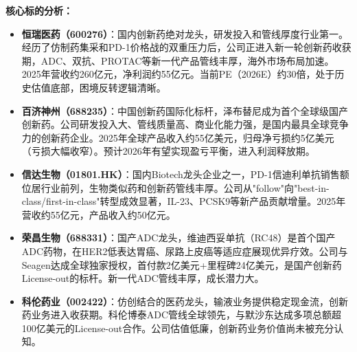 \begin{exhibitbox}[图 6-6：创新药产业链图谱与核心标的]
\vspace{0.2cm}
\end{exhibitbox}

\textbf{核心标的分析：}

\begin{itemize}[leftmargin=2em]
\item \textbf{恒瑞医药（600276）}：国内创新药绝对龙头，研发投入和管线厚度行业第一。经历了仿制药集采和PD-1价格战的双重压力后，公司正进入新一轮创新药收获期，ADC、双抗、PROTAC等新一代产品管线丰厚，海外市场布局加速。2025年营收约260亿元，净利润约55亿元。当前PE（2026E）约30倍，处于历史估值底部，困境反转逻辑清晰。

\item \textbf{百济神州（688235）}：中国创新药国际化标杆，泽布替尼成为首个全球级国产创新药。公司研发投入大、管线质量高、商业化能力强，是国内最具全球竞争力的创新药企业。2025年全球产品收入约55亿美元，归母净亏损约5亿美元（亏损大幅收窄）。预计2026年有望实现盈亏平衡，进入利润释放期。

\item \textbf{信达生物（01801.HK）}：国内Biotech龙头企业之一，PD-1信迪利单抗销售额位居行业前列，生物类似药和创新药管线丰厚。公司从"follow"向"best-in-class/first-in-class"转型成效显著，IL-23、PCSK9等新产品贡献增量。2025年营收约55亿元，产品收入约50亿元。

\item \textbf{荣昌生物（688331）}：国产ADC龙头，维迪西妥单抗（RC48）是首个国产ADC药物，在HER2低表达胃癌、尿路上皮癌等适应症展现优异疗效。公司与Seagen达成全球独家授权，首付款2亿美元+里程碑24亿美元，是国产创新药License-out的标杆。新一代ADC管线丰厚，成长潜力大。

\item \textbf{科伦药业（002422）}：仿创结合的医药龙头，输液业务提供稳定现金流，创新药业务进入收获期。科伦博泰ADC管线全球领先，与默沙东达成多项总额超100亿美元的License-out合作。公司估值低廉，创新药业务价值尚未被充分认知。
\end{itemize}

